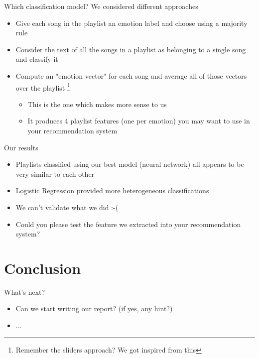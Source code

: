 \documentclass[xcolor=dvipsnames]{beamer}
\begin{document}
\begin{frame}{Which classification model?}
We considered different approaches
\begin{itemize}
\item Give each song in the playlist an emotion label and choose using a majority rule
\item Consider the text of all the songs in a playlist as belonging to a single song and classify it
\item Compute an "emotion vector" for each song and average all of those vectors over the playlist
	\footnote{Remember the sliders approach? We got inspired from this}
	\begin{itemize}
	\item This is the one which makes more sense to us
	\item It produces 4 playlist features (one per emotion) you may want to use in your recommendation system
	\end{itemize}
\end{itemize}
\end{frame}

\begin{frame}{Our results}
\begin{itemize}
\item Playlists classified using our best model (neural network) all appears to be very similar to each other
\item Logistic Regression provided more heterogeneous classifications
\item We can't validate what we did :-(
\item Could you please test the feature we extracted into your recommendation system?
\end{itemize}
\end{frame}

\section{Conclusion}

\begin{frame}{What's next?}
\begin{itemize}
\item Can we start writing our report? (if yes, any hint?)
\item ...
\end{itemize}
\end{frame}

\end{document}

